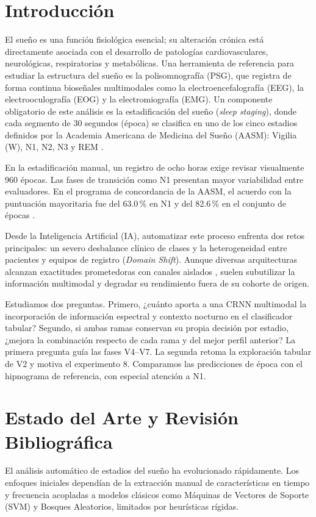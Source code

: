 \documentclass[conference]{IEEEtran}
\begin{document}
\section{Introducción}
El sueño es una función fisiológica esencial; su alteración crónica está directamente asociada con el desarrollo de patologías cardiovasculares, neurológicas, respiratorias y metabólicas. Una herramienta de referencia para estudiar la estructura del sueño es la polisomnografía (PSG), que registra de forma continua bioseñales multimodales como la electroencefalografía (EEG), la electrooculografía (EOG) y la electromiografía (EMG). Un componente obligatorio de este análisis es la estadificación del sueño (\textit{sleep staging}), donde cada segmento de 30 segundos (época) se clasifica en uno de los cinco estadios definidos por la Academia Americana de Medicina del Sueño (AASM): Vigilia (W), N1, N2, N3 y REM \cite{berry2020}.

En la estadificación manual, un registro de ocho horas exige revisar visualmente 960 épocas. Las fases de transición como N1 presentan mayor variabilidad entre evaluadores. En el programa de concordancia de la AASM, el acuerdo con la puntuación mayoritaria fue del 63.0\,\% en N1 y del 82.6\,\% en el conjunto de épocas \cite{rosenberg2013}.

Desde la Inteligencia Artificial (IA), automatizar este proceso enfrenta dos retos principales: un severo desbalance clínico de clases y la heterogeneidad entre pacientes y equipos de registro (\textit{Domain Shift}). Aunque diversas arquitecturas alcanzan exactitudes prometedoras con canales aislados \cite{supratak2020}, suelen subutilizar la información multimodal y degradar su rendimiento fuera de su cohorte de origen.

Estudiamos dos preguntas. Primero, ¿cuánto aporta a una CRNN multimodal la incorporación de información espectral y contexto nocturno en el clasificador tabular? Segundo, si ambas ramas conservan su propia decisión por estadio, ¿mejora la combinación respecto de cada rama y del mejor perfil anterior? La primera pregunta guía las fases V4--V7. La segunda retoma la exploración tabular de V2 y motiva el experimento 8. Comparamos las predicciones de época con el hipnograma de referencia, con especial atención a N1.

\section{Estado del Arte y Revisión Bibliográfica}
El análisis automático de estadios del sueño ha evolucionado rápidamente. Los enfoques iniciales dependían de la extracción manual de características en tiempo y frecuencia acopladas a modelos clásicos como Máquinas de Vectores de Soporte (SVM) y Bosques Aleatorios, limitados por heurísticas rígidas.
\end{document}
